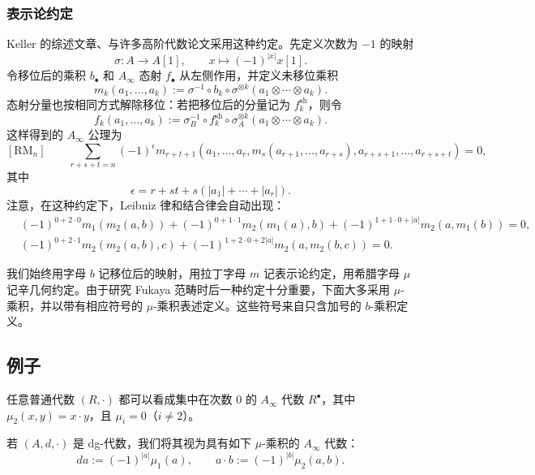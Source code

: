 \subsubsection*{表示论约定}
Keller 的综述文章、与许多高阶代数论文采用这种约定。先定义次数为 $-1$ 的映射
\[
  \sigma\colon A\to A[1],\qquad x\longmapsto(-1)^{|x|}x[1].
\]
令移位后的乘积 $b_\bullet$ 和 $A_\infty$ 态射 $f_\bullet$ 从左侧作用，并定义未移位乘积
\[
  m_k(a_1,\ldots,a_k)
  :=\sigma^{-1}\circ b_k\circ\sigma^{\otimes k}
       (a_1\otimes\cdots\otimes a_k).
\]
态射分量也按相同方式解除移位：若把移位后的分量记为 $f_k^{\mathrm{sh}}$，则令
\[
  f_k(a_1,\ldots,a_k)
  :=\sigma_B^{-1}\circ f_k^{\mathrm{sh}}\circ\sigma_A^{\otimes k}
       (a_1\otimes\cdots\otimes a_k).
\]
这样得到的 $A_\infty$ 公理为
\[
  [\mathrm{RM}_n]\qquad
  \sum_{r+s+t=n}(-1)^\epsilon
  m_{r+t+1}(a_1,\ldots,a_r,m_s(a_{r+1},\ldots,a_{r+s}),
      a_{r+s+1},\ldots,a_{r+s+t})=0,
\]
其中
\[
  \epsilon=r+st+s(|a_1|+\cdots+|a_r|).
\]
注意，在这种约定下，Leibniz 律和结合律会自动出现：
\begin{align*}
  &(-1)^{0+2\cdot0}m_1(m_2(a,b))
  +(-1)^{0+1\cdot1}m_2(m_1(a),b)
  +(-1)^{1+1\cdot0+|a|}m_2(a,m_1(b))=0,\\
  &(-1)^{0+2\cdot1}m_2(m_2(a,b),c)
  +(-1)^{1+2\cdot0+2|a|}m_2(a,m_2(b,c))=0.
\end{align*}

\begin{note}
我们始终用字母 $b$ 记移位后的映射，用拉丁字母 $m$ 记表示论约定，用希腊字母 $\mu$ 记辛几何约定。由于研究 Fukaya 范畴时后一种约定十分重要，下面大多采用 $\mu$-乘积，并以带有相应符号的 $\mu$-乘积表述定义。这些符号来自只含加号的 $b$-乘积定义。
\end{note}

\subsection{例子}\label{subsec:ainfty-examples}
\begin{example}[普通代数]\label{ex:ordinary-algebra-ainfty}
任意普通代数 $(R,\cdot)$ 都可以看成集中在次数 $0$ 的 $A_\infty$ 代数 $R^\bullet$，其中 $\mu_2(x,y)=x\cdot y$，且 $\mu_i=0$（$i\neq2$）。
\end{example}

\begin{example}[微分分次代数]\label{ex:dg-algebra-ainfty}
若 $(A,d,\cdot)$ 是 dg-代数，我们将其视为具有如下 $\mu$-乘积的 $A_\infty$ 代数：
\[
  da:=(-1)^{|a|}\mu_1(a),
  \qquad
  a\cdot b:=(-1)^{|b|}\mu_2(a,b).
\]
\end{example}


